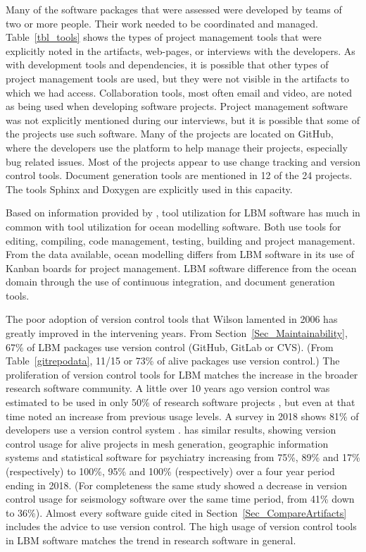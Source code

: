 \documentclass[final, 3p, times, authoryear]{elsarticle}
\begin{document}
Many of the software packages that were assessed were developed by teams of two
or more people. Their work needed to be coordinated and managed.
Table~\ref{tbl_tools} shows the types of project management tools that were
explicitly noted in the artifacts, web-pages, or interviews with the developers.
As with development tools and dependencies, it is possible that other types of
project management tools are used, but they were not visible in the artifacts to
which we had access.  Collaboration tools, most often email and video, are noted
as being used when developing software projects. Project management software was
not explicitly mentioned during our interviews, but it is possible that some of
the projects use such software. Many of the projects are located on GitHub,
where the developers use the platform to help manage their projects, especially
bug related issues. Most of the projects appear to use change tracking and
version control tools. Document generation tools are mentioned in 12 of the 24
projects. The tools Sphinx and Doxygen are explicitly used in this capacity.

Based on information provided by \citet{JungEtAl2022}, tool utilization for
LBM software has much in common with tool utilization for ocean modelling
software.  Both use tools for editing, compiling, code management, testing,
building and project management.  From the data available, ocean modelling
differs from LBM software in its use of Kanban boards for project management.
LBM software difference from the ocean domain through the use of continuous
integration, and document generation tools.

The poor adoption of version control tools that Wilson lamented in 2006
\citep{Wilson2006} has greatly improved in the intervening years.  From
Section~\ref{Sec_Maintainability}, 67\% of LBM packages use version control
(GitHub, GitLab or CVS).  (From Table~\ref{gitrepodata}, 11/15 or 73\% of alive
packages use version control.)  The proliferation of version control tools for
LBM matches the increase in the broader research software community.  A little
over 10 years ago version control was estimated to be used in only 50\% of
research software projects \citep{Nguyen-HoanEtAl2010}, but even at that time
\citet{Nguyen-HoanEtAl2010} noted an increase from previous usage levels. A
survey in 2018 shows 81\% of developers use a version control system
\citep{AlNoamanyAndBorghi2018}.  \citet{Smith2018} has similar results, showing
version control usage for alive projects in mesh generation, geographic
information systems and statistical software for psychiatry increasing from
75\%, 89\% and 17\% (respectively) to 100\%, 95\% and 100\% (respectively) over
a four year period ending in 2018.  (For completeness the same study showed a
decrease in version control usage for seismology software over the same time
period, from 41\% down to 36\%).  Almost every software guide cited in
Section~\ref{Sec_CompareArtifacts} includes the advice to use version control.
The high usage of version control tools in LBM software matches the trend in
research software in general.
\end{document}
